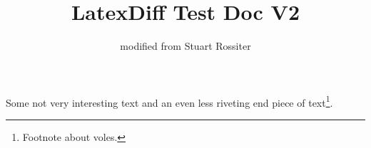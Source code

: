\documentclass[11pt,a4paper,twoside,notitlepage]{article}
\title{LatexDiff Test Doc V2}
\author{modified from Stuart Rossiter}
\begin{document}
\maketitle

Some not very interesting text and an even less riveting end piece of
text\footnote{Footnote about voles.}.
\end{document}
